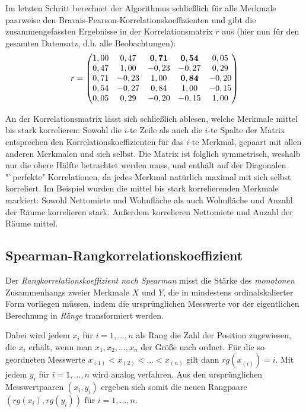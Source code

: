 \noindent Im letzten Schritt berechnet der Algorithmus schließlich für alle Merkmale paarweise den Bravais-Pearson-Korrelationskoeffizienten und gibt die zusammengefassten Ergebnisse in der Korrelationsmatrix $r$ aus (hier nun für den gesamten Datensatz, d.h. alle Beobachtungen):
\begin{equation*}
	r =
	\begin{pmatrix}
		1,00 & 0,47 & {\bf 0,71} & {\bf 0,54} & 0,05\\
 		0,47 & 1,00 & -0,23 & -0,27 & 0,29\\
 		0,71 & -0,23 & 1,00 & {\bf 0,84} & -0,20\\
		0,54 & -0,27 & 0,84 & 1,00 & -0,15\\
  		0,05 &  0,29 & -0,20 & -0,15 & 1,00\\
	\end{pmatrix}
\end{equation*}

\noindent An der Korrelationsmatrix lässt sich schließlich ablesen, welche Merkmale mittel bis stark korrelieren: Sowohl die $i$-te Zeile als auch die $i$-te Spalte der Matrix  entsprechen den Korrelationskoeffizienten für das $i$-te Merkmal, gepaart mit allen anderen Merkmalen und sich selbst. Die Matrix ist folglich symmetrisch, weshalb nur die obere Hälfte betrachtet werden muss, und enthält auf der Diagonalen "`perfekte" Korrelationen, da jedes Merkmal natürlich maximal mit sich selbst korreliert. Im Beispiel wurden die mittel bis stark korrelierenden Merkmale markiert: Sowohl Nettomiete und Wohnfläche als auch Wohnfläche und Anzahl der Räume korrelieren stark. Außerdem korrelieren Nettomiete und Anzahl der Räume mittel.

\subsection{Spearman-Rangkorrelationskoeffizient}

Der {\it Rangkorrelationskoeffizient nach Spearman} misst die Stärke des {\it monotonen} Zusammenhangs zweier Merkmale $X$ und $Y$, die in mindestens ordinalskalierter Form vorliegen müssen, indem die ursprünglichen Messwerte vor der eigentlichen Berechnung in {\it Ränge} transformiert werden.

Dabei wird jedem $x_i$ für $i=1,...,n$ als Rang die Zahl der Position zugewiesen, die $x_i$ erhält, wenn man $x_1, x_2, ..., x_n$ der Größe nach ordnet. Für die so geordneten Messwerte $x_{(1)}<x_{(2)}<...<x_{(n)}$ gilt dann $rg(x_{(i)})=i$. Mit jedem $y_i$ für $i=1,...,n$ wird analog verfahren. Aus den ursprünglichen Messwertpaaren $(x_i, y_i)$ ergeben sich somit die neuen Rangpaare $(rg(x_i), rg(y_i))$ für $i=1,...,n$.

